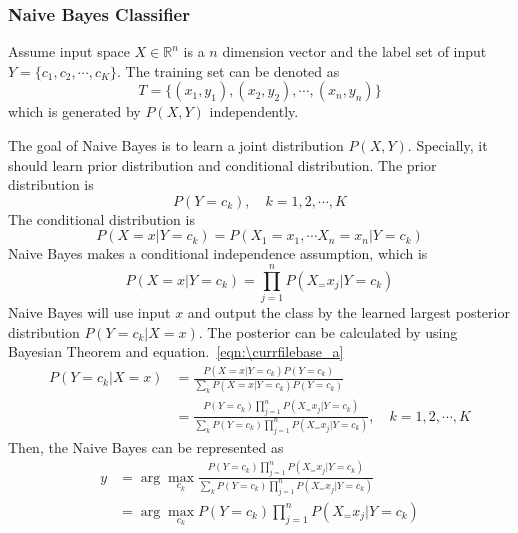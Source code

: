 \documentclass[catalog.tex]{subfiles}
\begin{document}
\subsubsection{Naive Bayes Classifier}
Assume input space $X\in \mathbb{R}^n$ is a $n$ dimension vector and the label set of input $Y=\{c_1, c_2, \cdots, c_K\}$. The training set can be denoted as 
\begin{equation}
T = \{(x_1,y_1), (x_2, y_2), \cdots, (x_n,y_n)\}
\end{equation}
which is generated by $P(X,Y)$ independently.
\par The goal of Naive Bayes is to learn a joint distribution $P(X,Y)$. Specially, it should learn prior distribution and conditional distribution. The prior distribution is
\begin{equation}
P(Y=c_k),\quad k=1,2,\cdots,K
\end{equation}
The conditional distribution is 
\begin{equation}
P(X=x|Y=c_k) = P(X_1 = x_1, \cdots X_n = x_n|Y=c_k)
\end{equation}
Naive Bayes makes a conditional independence assumption, which is
\begin{equation}
P(X=x|Y=c_k) = \prod_{j=1}^{n}P(X_=x_j|Y=c_k)
\label{eqn:\currfilebase_a}
\end{equation}
Naive Bayes will use input $x$ and output the class by the learned largest posterior distribution $P(Y=c_k|X=x)$. The posterior can be calculated by using Bayesian Theorem and equation.~\ref{eqn:\currfilebase_a}
\begin{align}
P(Y=c_k|X=x) &= \frac{P(X=x|Y=c_k)P(Y=c_k)}{\sum_kP(X=x|Y=c_k)P(Y=c_k)}\\
&= \frac{P(Y=c_k)\prod_{j=1}^{n}P(X_=x_j|Y=c_k)}{\sum_kP(Y=c_k) \prod_{j=1}^{n}P(X_=x_j|Y=c_k)}, \quad k=1,2,\cdots, K
\label{eqn:\currfilebase_b}
\end{align}
Then, the Naive Bayes can be represented as
\begin{align}
y &=\arg \max_{c_k}\frac{P(Y=c_k)\prod_{j=1}^{n}P(X_=x_j|Y=c_k)}{\sum_kP(Y=c_k) \prod_{j=1}^{n}P(X_=x_j|Y=c_k)}\\
&=\arg \max_{c_k} P(Y=c_k)\prod_{j=1}^{n}P(X_=x_j|Y=c_k)
\label{eqn:\currfilebase_c}
\end{align}
\end{document}
